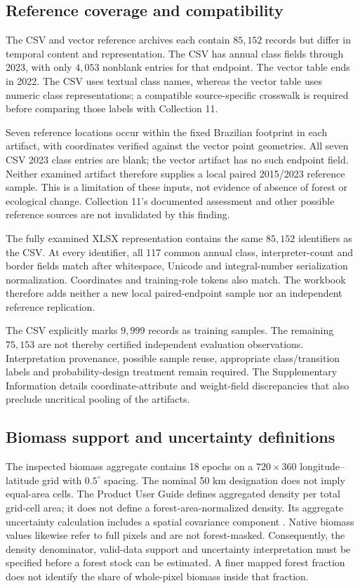 \documentclass[11pt,a4paper]{article}
\begin{document}
\subsection{Reference coverage and compatibility}
The CSV and vector reference archives each contain $85{,}152$ records but differ in temporal content and representation. The CSV has annual class fields through 2023, with only $4{,}053$ nonblank entries for that endpoint. The vector table ends in 2022. The CSV uses textual class names, whereas the vector table uses numeric class representations; a compatible source-specific crosswalk is required before comparing those labels with Collection 11.

Seven reference locations occur within the fixed Brazilian footprint in each artifact, with coordinates verified against the vector point geometries. All seven CSV 2023 class entries are blank; the vector artifact has no such endpoint field. Neither examined artifact therefore supplies a local paired 2015/2023 reference sample. This is a limitation of these inputs, not evidence of absence of forest or ecological change. Collection 11's documented assessment and other possible reference sources are not invalidated by this finding.

The fully examined XLSX representation contains the same $85{,}152$ identifiers as the CSV. At every identifier, all 117 common annual class, interpreter-count and border fields match after whitespace, Unicode and integral-number serialization normalization. Coordinates and training-role tokens also match. The workbook therefore adds neither a new local paired-endpoint sample nor an independent reference replication.

The CSV explicitly marks $9{,}999$ records as training samples. The remaining $75{,}153$ are not thereby certified independent evaluation observations. Interpretation provenance, possible sample reuse, appropriate class/transition labels and probability-design treatment remain required. The Supplementary Information details coordinate-attribute and weight-field discrepancies that also preclude uncritical pooling of the artifacts.

\subsection{Biomass support and uncertainty definitions}
The inspected biomass aggregate contains 18 epochs on a $720\times360$ longitude--latitude grid with $0.5^\circ$ spacing. The nominal 50 km designation does not imply equal-area cells. The Product User Guide defines aggregated density per total grid-cell area; it does not define a forest-area-normalized density. Its aggregate uncertainty calculation includes a spatial covariance component \citep{PUG2026}. Native biomass values likewise refer to full pixels and are not forest-masked. Consequently, the density denominator, valid-data support and uncertainty interpretation must be specified before a forest stock can be estimated. A finer mapped forest fraction does not identify the share of whole-pixel biomass inside that fraction.
\end{document}
